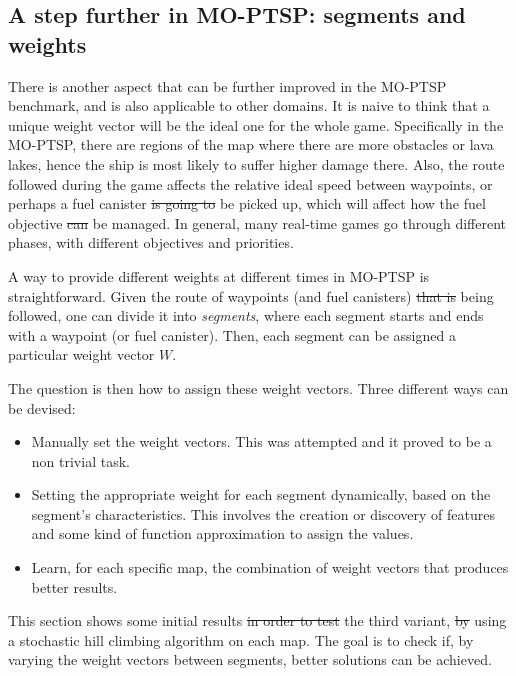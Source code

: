 \documentclass[journal]{IEEEtran}
\providecommand{\DIFaddtex}[1]{{\protect\color{blue}\uwave{#1}}} %
\providecommand{\DIFdeltex}[1]{{\protect\color{red}\sout{#1}}}                      %
\providecommand{\DIFaddbegin}{} %
\providecommand{\DIFaddend}{} %
\providecommand{\DIFdelbegin}{} %
\providecommand{\DIFdelend}{} %
\providecommand{\DIFadd}[1]{\texorpdfstring{\DIFaddtex{#1}}{#1}} %
\providecommand{\DIFdel}[1]{\texorpdfstring{\DIFdeltex{#1}}{}} %
\begin{document}
\subsection{A step further in MO-PTSP: segments and weights} \label{ssec:resVarW}

There is another aspect that can be further improved in the MO-PTSP benchmark, and is also applicable to other domains. It is naive to think that a unique weight vector will be the ideal one for the whole game. Specifically in the MO-PTSP, there are regions of the map where there are more obstacles or lava lakes, hence the ship is most likely to suffer higher damage there. Also, the route followed during the game affects the relative ideal speed between waypoints, or perhaps a fuel canister \DIFdelbegin \DIFdel{is going to }\DIFdelend \DIFaddbegin \DIFadd{may }\DIFaddend be picked up, which will affect how the fuel objective \DIFdelbegin \DIFdel{can }\DIFdelend \DIFaddbegin \DIFadd{will }\DIFaddend be managed. In general, many real-time games go through different phases, with different objectives and priorities.

A way to provide different weights at different times in MO-PTSP is straightforward. Given the route of waypoints (and fuel canisters) \DIFdelbegin \DIFdel{that is }\DIFdelend being followed, one can divide it into \textit{segments}, where each segment starts and ends with a waypoint (or fuel canister). Then, each segment can be assigned a particular weight vector $W$. 

The question is then how to assign these weight vectors. Three different ways can be devised:

\begin{itemize}
\item Manually set the weight vectors. This was attempted and it proved to be a non trivial task.
\item Setting the appropriate weight for each segment dynamically, based on the segment's characteristics. This involves the creation or discovery of features and some kind of function approximation to assign the values. 
\item Learn, for each specific map, the combination of weight vectors that produces better results.
\end{itemize}

This section shows some initial results \DIFdelbegin \DIFdel{in order to test }\DIFdelend \DIFaddbegin \DIFadd{obtained when testing }\DIFaddend the third variant, \DIFdelbegin \DIFdel{by }\DIFdelend using a stochastic hill climbing algorithm on each map. The goal is to check if, by varying the weight vectors between segments, better solutions can be achieved. 
\end{document}
